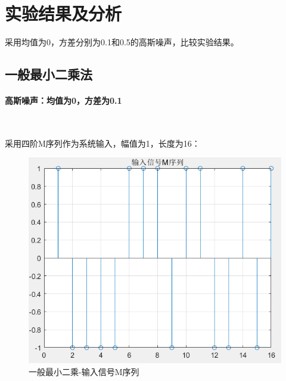 \documentclass[UTF8]{article}
\begin{document}
%
\section{实验结果及分析}
采用均值为0，方差分别为0.1和0.5的高斯噪声，比较实验结果。

\subsection{一般最小二乘法}
\paragraph{高斯噪声：均值为0，方差为0.1}~{}

采用四阶M序列作为系统输入，幅值为1，长度为16：
\begin{figure}[H]
    \centering %
    \includegraphics[width=.8\textwidth]{figure/一般最小二乘-输入信号M序列.png} 
    \caption{一般最小二乘-输入信号M序列} %
\end{figure}
\end{document}
